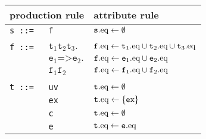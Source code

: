 \begin{figure}\centering
\begin{tabular}{lll}
\hline
\multicolumn{2}{l}{production rule\hspace*{0.3\textwidth}} & attribute rule\\
  \hline
\texttt{s ::=}&\texttt{f}& $\texttt{s}.\text{eq} \leftarrow \emptyset$\\
       &&\\
\texttt{f ::= } &  $ \texttt{t}_1 \texttt{t}_2 \texttt{t}_3.$&   $ \texttt{f}.\text{eq} \leftarrow \texttt{t}_1.\text{eq}\cup \texttt{t}_2.\text{eq}\cup \texttt{t}_3.\text{eq}$ \\
    &  $\texttt{e}_1 \texttt{=>}  \texttt{e}_2.$& $\texttt{f}.\text{eq} \leftarrow \texttt{e}_1.\text{eq}\cup \texttt{e}_2.\text{eq}$ \\
    & $ \texttt{f}_1 \texttt{f}_2$ &                $\texttt{f}.\text{eq} \leftarrow \texttt{f}_1.\text{eq}\cup \texttt{f}_2.\text{eq}$ \\
&&\\
\texttt{t ::=}& \texttt{uv}\hspace{0.07\textwidth} &                $\texttt{t}.\text{eq} \leftarrow\emptyset$\\
            & \texttt{ex} &               $\texttt{t}.\text{eq} \leftarrow \{\texttt{ex}\}$\\
      & \texttt{c} &               $\texttt{t}.\text{eq} \leftarrow\emptyset$\\
      & \texttt{e} &                $\texttt{t}.\text{eq} \leftarrow\texttt{e}.\text{eq} $\\

\end{tabular}
\end{figure}
